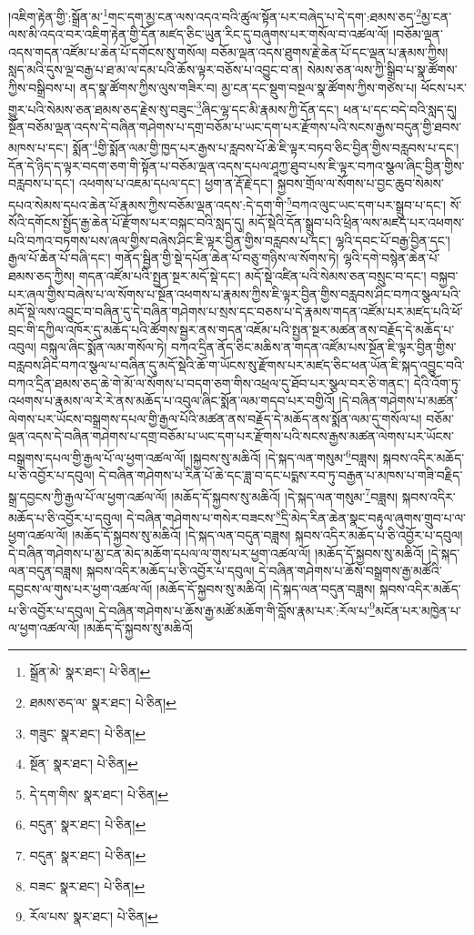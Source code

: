 །འཇིག་རྟེན་གྱི་:སྒྲོན་མ་\footnote{སྒྲོན་མེ་  སྣར་ཐང་།  པེ་ཅིན། }གང་དག་མྱ་ངན་ལས་འདའ་བའི་ཚུལ་སྟོན་པར་བཞེད་པ་དེ་དག་:ཐམས་ཅད་\footnote{ཐམས་ཅད་ལ་  སྣར་ཐང་།  པེ་ཅིན། }མྱ་ངན་ལས་མི་འདའ་བར་འཇིག་རྟེན་གྱི་དོན་མཛད་ཅིང་ཡུན་རིང་དུ་བཞུགས་པར་གསོལ་བ་འཚལ་ལོ། །བཅོམ་ལྡན་འདས་གདན་འཛོམ་པ་ཆེན་པོ་དགོངས་སུ་གསོལ། བཅོམ་ལྡན་འདས་ཐུགས་རྗེ་ཆེན་པོ་དང་ལྡན་པ་རྣམས་ཀྱིས། སླད་མའི་དུས་ལྔ་བརྒྱ་པ་ཐ་མ་ལ་དམ་པའི་ཆོས་ལྟར་བཅོས་པ་འབྱུང་བ་ན། སེམས་ཅན་ལས་ཀྱི་སྒྲིབ་པ་སྣ་ཚོགས་ཀྱིས་བསྒྲིབས་པ། ནད་སྣ་ཚོགས་ཀྱིས་ལུས་གཟིར་བ། མྱ་ངན་དང་སྡུག་བསྔལ་སྣ་ཚོགས་ཀྱིས་གཙེས་པ། ཕོངས་པར་གྱུར་པའི་སེམས་ཅན་ཐམས་ཅད་རྗེས་སུ་བཟུང་\footnote{གཟུང་  སྣར་ཐང་།  པེ་ཅིན། }ཞིང་ལྷ་དང་མི་རྣམས་ཀྱི་དོན་དང་། ཕན་པ་དང་བདེ་བའི་སླད་དུ། སྔོན་བཅོམ་ལྡན་འདས་དེ་བཞིན་གཤེགས་པ་དགྲ་བཅོམ་པ་ཡང་དག་པར་རྫོགས་པའི་སངས་རྒྱས་བདུན་གྱི་ཐབས་མཁས་པ་དང་། སྨོན་\footnote{སྔོན་  སྣར་ཐང་།  པེ་ཅིན། }གྱི་སྨོན་ལམ་གྱི་ཁྱད་པར་རྒྱས་པ་རླབས་པོ་ཆེ་ཇི་ལྟར་བཏབ་ཅིང་བྱིན་གྱིས་བརླབས་པ་དང་། དོན་དེ་ཉིད་ད་ལྟར་བདག་ཅག་གི་སྟོན་པ་བཅོམ་ལྡན་འདས་དཔལ་ཤཱཀྱ་ཐུབ་པས་ཇི་ལྟར་བཀའ་སྩལ་ཞིང་བྱིན་གྱིས་བརླབས་པ་དང་། འཕགས་པ་འཇམ་དཔལ་དང་། ཕྱག་ན་རྡོ་རྗེ་དང་། སྐྱབས་གྲོལ་ལ་སོགས་པ་བྱང་ཆུབ་སེམས་དཔའ་སེམས་དཔའ་ཆེན་པོ་རྣམས་ཀྱིས་བཅོམ་ལྡན་འདས་:དེ་དག་གི་\footnote{དེ་དག་གིས་  སྣར་ཐང་།  པེ་ཅིན། }བཀའ་ལུང་ཡང་དག་པར་སྒྲུབ་པ་དང་། སོ་སོའི་དགོངས་སྤྱོད་རྒྱ་ཆེན་པོ་རྫོགས་པར་བསྐང་བའི་སླད་དུ། མདོ་སྡེའི་དོན་སྒྲུབ་པའི་ཕྲིན་ལས་མཛད་པར་འཕགས་པའི་བཀའ་བཏགས་པས་ཞལ་གྱིས་བཞེས་ཤིང་ཇི་ལྟར་བྱིན་གྱིས་བརླབས་པ་དང་། ལྷའི་དབང་པོ་བརྒྱ་བྱིན་དང་། རྒྱལ་པོ་ཆེན་པོ་བཞི་དང་། གནོད་སྦྱིན་གྱི་སྡེ་དཔོན་ཆེན་པོ་བཅུ་གཉིས་ལ་སོགས་ཏེ། ལྷའི་དགེ་བསྙེན་ཆེན་པོ་ཐམས་ཅད་ཀྱིས། གདན་འཛོམ་པའི་སྤྱན་སྔར་མདོ་སྡེ་དང་། མདོ་སྡེ་འཛིན་པའི་སེམས་ཅན་བསྲུང་བ་དང་། བསྐྱབ་པར་ཞལ་གྱིས་བཞེས་པ་ལ་སོགས་པ་སྔོན་འཕགས་པ་རྣམས་ཀྱིས་ཇི་ལྟར་བྱིན་གྱིས་བརླབས་ཤིང་བཀའ་སྩལ་པའི་མདོ་སྡེ་ལས་འབྱུང་བ་བཞིན་དུ་དེ་བཞིན་གཤེགས་པ་སྲས་དང་བཅས་པ་དེ་རྣམས་གདན་འཛོམ་པར་མཛད་པའི་ཕོ་བྲང་གི་དཀྱིལ་འཁོར་དུ་མཆོད་པའི་ཚོགས་སྦྱར་ནས་གདན་འཇོམ་པའི་སྤྱན་སྔར་མཚན་ནས་བརྗོད་དེ་མཆོད་པ་འབུལ། བསྐུལ་ཞིང་སྨོན་ལམ་གསོལ་ཏེ། བཀའ་དྲིན་ནོད་ཅིང་མཆིས་ན་གདན་འཛོམ་པས་སྔོན་ཇི་ལྟར་བྱིན་གྱིས་བརླབས་ཤིང་བཀའ་སྩལ་པ་བཞིན་དུ་མདོ་སྡེའི་ཆོ་ག་ཡོངས་སུ་རྫོགས་པར་མཛད་ཅིང་ཕན་ཡོན་ཇི་སྐད་འབྱུང་བའི་བཀའ་དྲིན་ཐམས་ཅད་ཆེ་གེ་མོ་ལ་སོགས་པ་བདག་ཅག་གིས་འཕྲལ་དུ་ཐོབ་པར་སྩལ་བར་ཅི་གནང་། དེའི་འོག་ཏུ་འཕགས་པ་རྣམས་ལ་རེ་རེ་ནས་མཆོད་པ་འབུལ་ཞིང་སྨོན་ལམ་གདབ་པར་བགྱིའོ། །དེ་བཞིན་གཤེགས་པ་མཚན་ལེགས་པར་ཡོངས་བསྒྲགས་དཔལ་གྱི་རྒྱལ་པོའི་མཚན་ནས་བརྗོད་དེ་མཆོད་ནས་སྨོན་ལམ་དུ་གསོལ་པ། བཅོམ་ལྡན་འདས་དེ་བཞིན་གཤེགས་པ་དགྲ་བཅོམ་པ་ཡང་དག་པར་རྫོགས་པའི་སངས་རྒྱས་མཚན་ལེགས་པར་ཡོངས་བསྒྲགས་དཔལ་གྱི་རྒྱལ་པོ་ལ་ཕྱག་འཚལ་ལོ། །སྐྱབས་སུ་མཆིའོ། །དེ་སྐད་ལན་གསུམ་\footnote{བདུན་  སྣར་ཐང་།  པེ་ཅིན། }བཟླས། སྐབས་འདིར་མཆོད་པ་ཅི་འབྱོར་པ་དབུལ། དེ་བཞིན་གཤེགས་པ་རིན་པོ་ཆེ་དང་ཟླ་བ་དང་པདྨས་རབ་ཏུ་བརྒྱན་པ་མཁས་པ་གཟི་བརྗིད་སྒྲ་དབྱངས་ཀྱི་རྒྱལ་པོ་ལ་ཕྱག་འཚལ་ལོ། །མཆོད་དོ་སྐྱབས་སུ་མཆིའོ། །དེ་སྐད་ལན་གསུམ་\footnote{བདུན་  སྣར་ཐང་།  པེ་ཅིན། }བཟླས། སྐབས་འདིར་མཆོད་པ་ཅི་འབྱོར་པ་དབུལ། དེ་བཞིན་གཤེགས་པ་གསེར་བཟངས་\footnote{བཟང་  སྣར་ཐང་།  པེ་ཅིན། }དྲི་མེད་རིན་ཆེན་སྣང་བརྟུལ་ཞུགས་གྲུབ་པ་ལ་ཕྱག་འཚལ་ལོ། །མཆོད་དོ་སྐྱབས་སུ་མཆིའོ། །དེ་སྐད་ལན་བདུན་བཟླས། སྐབས་འདིར་མཆོད་པ་ཅི་འབྱོར་པ་དབུལ། དེ་བཞིན་གཤེགས་པ་མྱ་ངན་མེད་མཆོག་དཔལ་ལ་གུས་པར་ཕྱག་འཚལ་ལོ། །མཆོད་དོ་སྐྱབས་སུ་མཆིའོ། །དེ་སྐད་ལན་བདུན་བཟླས། སྐབས་འདིར་མཆོད་པ་ཅི་འབྱོར་པ་དབུལ། དེ་བཞིན་གཤེགས་པ་ཆོས་བསྒྲགས་རྒྱ་མཚོའི་དབྱངས་ལ་གུས་པར་ཕྱག་འཚལ་ལོ། །མཆོད་དོ་སྐྱབས་སུ་མཆིའོ། །དེ་སྐད་ལན་བདུན་བཟླས། སྐབས་འདིར་མཆོད་པ་ཅི་འབྱོར་པ་དབུལ། དེ་བཞིན་གཤེགས་པ་ཆོས་རྒྱ་མཚོ་མཆོག་གི་བློས་རྣམ་པར་:རོལ་པ་\footnote{རོལ་པས་  སྣར་ཐང་།  པེ་ཅིན། }མངོན་པར་མཁྱེན་པ་ལ་ཕྱག་འཚལ་ལོ། །མཆོད་དོ་སྐྱབས་སུ་མཆིའོ། 